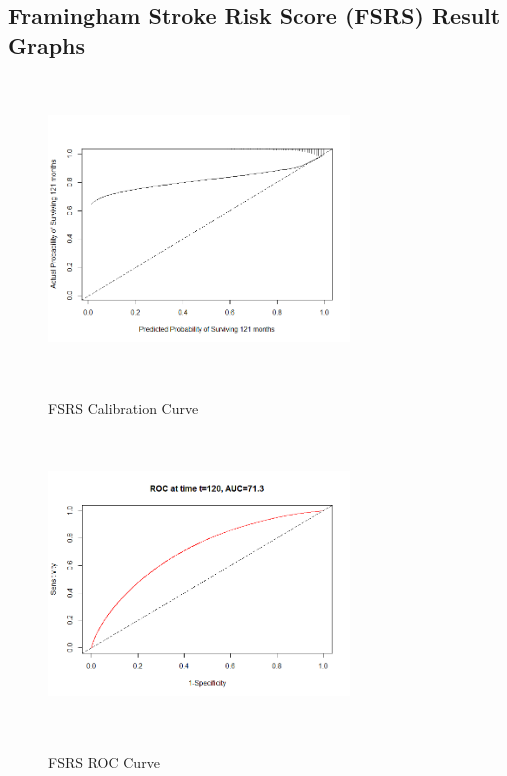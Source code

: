 \documentclass[a4paper,12pt]{article}
\begin{document}
\begin{appendices}
   			\subsection{Framingham Stroke Risk Score (FSRS) Result Graphs}
	   		\begin{figure}[H]
	   			\begin{minipage}{.45\linewidth}
	   				\includegraphics[width=8cm, height=8cm]{prelim-results/FSRS/FSRScal.png}
	   				\label{FSRS1}
	   				\captionsetup{justification=justified,singlelinecheck=false,margin=1cm}
	   				\caption{FSRS Calibration Curve}
	   			\end{minipage}
	   			\hspace{.01\linewidth}
	   			\begin{minipage}{.45\linewidth}
	   				\includegraphics[width=8cm, height=8cm]{prelim-results/FSRS/FSRSdisc.png}
	   				\label{FSRS2}
	   				\captionsetup{justification=justified,singlelinecheck=false,margin=1cm}
	   				\caption{FSRS ROC Curve}
	   			\end{minipage}
	   		\end{figure}
   		

\end{appendices}
\end{document}
